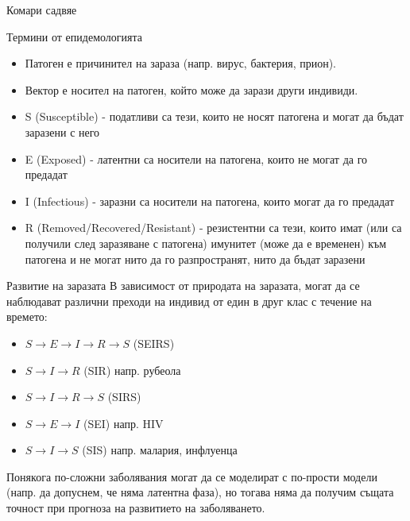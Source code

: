 \begin{frame}[t]{Комари}
  \cite{Bacaer2011}
  садвяе
\end{frame}

\begin{frame}[t]{Термини от епидемологията}
  \begin{itemize}
    \item Патоген е причинител на зараза (напр. вирус, бактерия, прион).
    \item Вектор е носител на патоген, който може да зарази други индивиди.
    \item S (Susceptible) - податливи са тези, които не носят патогена и могат да бъдат заразени с него
    \item E (Exposed) - латентни са носители на патогена, които не могат да го предадат
    \item I (Infectious) - заразни са носители на патогена, които могат да го предадат
    \item R (Removed/Recovered/Resistant) - резистентни са тези, които имат (или са получили след заразяване с патогена) имунитет (може да е временен) към патогена и не могат нито да го разпространят, нито да бъдат заразени
  \end{itemize}
\end{frame}

\begin{frame}[t]{Развитие на заразата}
  В зависимост от природата на заразата, могат да се наблюдават различни преходи на индивид от един в друг клас с течение на времето:
  \begin{itemize}
    \item $S \rightarrow E \rightarrow I \rightarrow R \rightarrow S$ (SEIRS)
    \item $S \rightarrow I \rightarrow R$ (SIR) напр. рубеола
    \item $S \rightarrow I \rightarrow R \rightarrow S$ (SIRS)
    \item $S \rightarrow E \rightarrow I$ (SEI) напр. HIV
    \item $S \rightarrow I \rightarrow S$ (SIS) напр. малария, инфлуенца
  \end{itemize}
  Понякога по-сложни заболявания могат да се моделират с по-прости модели (напр. да допуснем, че няма латентна фаза), но тогава няма да получим същата точност при прогноза на развитието на заболяването.
\end{frame}


